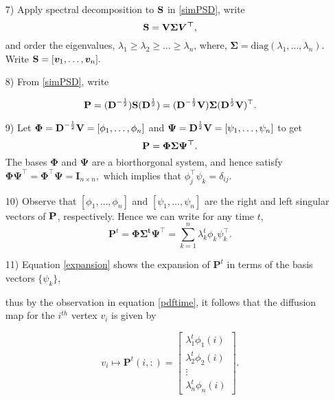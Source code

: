 \begin{itemize}
\item[7)] Apply spectral decomposition to $\textbf{S}$ in \eqref{simPSD}, write
\begin{equation}
\textbf{S} = \textbf{V}\bm{\Sigma}\bm{V^{\top}},
\end{equation}
and order the eigenvalues, $\lambda_{1}\geq \lambda_{2} \geq \ldots \geq \lambda_{n}$, where,  
$\bm{\Sigma} = \text{diag}(\lambda_{1}, \ldots, \lambda_{n})$. Write 
$\textbf{S} = [\boldsymbol{v}_{1}, \ldots, \boldsymbol{v}_{n}].$

\item[8)] From \eqref{simPSD}, write 

\[\textbf{P} = (\textbf{D}^{-\frac{1}{2}}) \textbf{S} (\textbf{D}^{\frac{1}{2}} ) = 
 (\textbf{D}^{-\frac{1}{2}} \textbf{V}) \bm{\Sigma} (\textbf{D}^{\frac{1}{2}} \textbf{V} )^{\top}.
\] 
\item[9)] Let $\bm{\Phi} = \textbf{D}^{-\frac{1}{2}} \textbf{V}  = [\phi_{1}, \ldots, \phi_{n}]$ and 
$\bm{\Psi} = \textbf{D}^{\frac{1}{2}} \textbf{V} = [\psi_{1}, \ldots, \psi_{n}] $
to get  
\[\textbf{P} = \bm{\Phi \Sigma \Psi^{\top}}.
\]
The bases $\bm{\Phi}$ and $\bm{\Psi}$ are a biorthorgonal system, and hence satisfy
$ \bm{\Phi}\bm{\Psi}^{\top} =  \bm{\Phi}^{\top}\bm{\Psi}  = \bm{I}_{n \times n},$
which implies that $\phi_{j}^{\top}\psi_{k} = \delta_{ij}$.
\item[10)] Observe that  $[\phi_{1}, \ldots, \phi_{n}]$ and $[\psi_{1}, \ldots, \psi_{n}]$ are the right and left singular vectors of $\textbf{P}$, respectively.
Hence we can write for any time $t$,
\begin{equation}\label{expansion}
 \bm{P}^{t} = \bm{\Phi \Sigma^{t} \Psi^{\top}} = \displaystyle \sum_{k=1}^{n} \lambda_{k}^{t} \phi_{k} \psi_{k}^{\top}.
\end{equation} 

\item[11)] Equation \eqref{expansion} shows the expansion of $\bm{P}^{t}$ 
in terms of  the basis vectors $\{\psi_{k}\}$, 

thus by the observation in equation \eqref{pdftime}, it follows that the diffusion map for the $i^{th}$ vertex $v_{i}$ is given by

$$ v_{i} \mapsto \bm{P}^{t}(i,:) = \begin{bmatrix}
         \lambda_{1}^{t}\phi_{1}(i)\\
         \lambda_{2}^{t}\phi_{2}(i)\\
         \vdots\\
         \lambda_{n}^{t}\phi_{n}(i)
        \end{bmatrix} .$$
        

\end{itemize}
